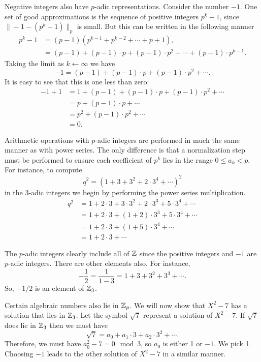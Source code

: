 Negative integers also have $p$-adic representations.  Consider the number
$-1$.  One set of good approximations is the sequence of positive integers
$p^k - 1$, since $\|-1 - (p^k -1) \|_p$ is small.  But this can be
written in the following manner
\[
\begin{aligned}
  p^k -1 & = (p-1)(p^{k-1} + p^{k-2} + \cdots + p + 1), \\
    & = (p-1) + (p-1)\cdot p + (p-1) \cdot p^2 + \cdots + (p-1) \cdot p^{k-1}.
\end{aligned}
\]
Taking the limit as $k \leftarrow \infty$ we have
\[
-1 = (p-1) + (p-1)\cdot p + (p-1) \cdot p^2 + \cdots .
\]
It is easy to see that this is one less than zero:
\[
\begin{aligned}
  -1 + 1 &=1 +  (p-1) + (p-1)\cdot p + (p-1) \cdot p^2 + \cdots \\
    &= p + (p-1) \cdot p + \cdots\\
    &= p^2 + (p-1) \cdot p^2 + \cdots\\
    &=0.
\end{aligned}
\]

\smallskip
Arithmetic operations with $p$-adic integers are performed in much the same
manner as with power series.  The only difference is that a normalization
step must be performed to ensure each coefficient of $p^k$ lies in the
range $0 \le a_k < p$.  For instance, to compute
\[
q^2 = (1 + 3 + 3^2 + 2\cdot 3^4 + \cdots)^2
\]
in the $3$-adic integers we begin by performing the power series
multiplication. 
\[
\begin{aligned}
  q^2&= 1 + 2\cdot 3 + 3 \cdot 3^2 + 2\cdot 3^3 + 5 \cdot 3^4 + \cdots\\
    &= 1 + 2\cdot 3 + (1 + 2) \cdot 3^3 + 5 \cdot 3^4 + \cdots\\
    &= 1 + 2 \cdot 3 + (1 + 5) \cdot 3^4 + \cdots\\
    &= 1 + 2 \cdot 3 + \cdots
\end{aligned}
\]

The $p$-adic integers clearly include all of $\mathbb{Z}$ since the positive
integers and $-1$ are $p$-adic integers.  There are other elements also.
For instance,
\[
-\frac{1}{2} = \frac{1}{1 - 3} = 1 + 3 + 3^2 + 3^3 + \cdots.
\]
So, $-1/2$ is an element of $\mathbb{Z}_3$.

Certain algebraic numbers also lie in $\mathbb{Z}_p$.  We will now show that $X^2 -
7$ has a solution that lies in $\mathbb{Z}_3$.  Let the symbol
$\sqrt{7}$ represent a solution of $X^2-7$.  
If $\sqrt{7}$ does lie in $\mathbb{Z}_3$ then we must have
\[
\sqrt{7} = a_0 + a_1 \cdot 3 + a_2 \cdot 3^2 + \cdots.
\]
Therefore, we must have $a_0^2 - 7 = 0 \mod{3}$, so $a_0$ is either 1
or $-1$.  We pick 1.  Choosing $-1$ leads to the other solution of $X^2 -
7$ in a similar manner.

